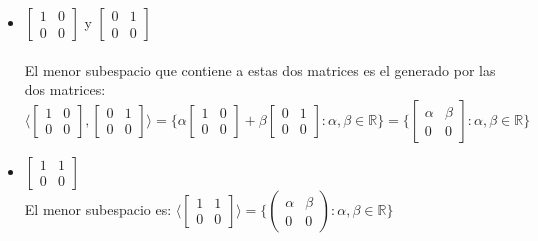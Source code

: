 \documentclass{article}
\begin{document}
\begin{itemize}
	\item
		$\begin{bmatrix}1 & 0 \\ 0 & 0 \end{bmatrix}$ y $\begin{bmatrix} 0 & 1 \\ 0 & 0 \end{bmatrix}$ \\ \\
		El menor subespacio que contiene a estas dos matrices es el generado por las dos matrices: \\
		$\Bigg \langle\begin{bmatrix}1&0\\0&0 \end{bmatrix}, \begin{bmatrix} 0&1 \\0&0\end{bmatrix}\Bigg\rangle 			= \Big \lbrace\alpha \begin{bmatrix} 1&0 \\ 0&0\end{bmatrix} + \beta \begin{bmatrix} 0&1 \\ 0&0\end{bmatrix} :
		\alpha,\beta \in \mathbb{R} \Big\rbrace = \Big\lbrace \begin{bmatrix} \alpha&\beta \\ 0&0 \end{bmatrix} :
		\alpha,\beta \in \mathbb{R} 
		\Big\rbrace$
  	\item
		$\begin{bmatrix} 1 & 1 \\ 0 & 0 \end{bmatrix}$ \\
		El menor subespacio es: 
		$\Big \langle \begin{bmatrix} 1&1 \\ 0&0 \end{bmatrix} \Big \rangle = \Big\lbrace \begin{pmatrix}
		\alpha & \beta \\ 0&0 \end{pmatrix} : \alpha,\beta \in \mathbb{R} \Big\rbrace$


\end{itemize}
\end{document}
